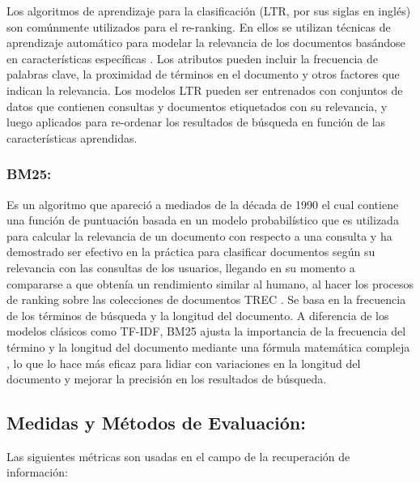 \documentclass[
  12pt,
  openany]{book}
\begin{document}
Los algoritmos de aprendizaje para la clasificación (LTR, por sus siglas en inglés) son comúnmente utilizados para el re-ranking. En ellos se utilizan técnicas de aprendizaje automático para modelar la relevancia de los documentos basándose en características específicas \citep{büttcher2010}. Los atributos pueden incluir la frecuencia de palabras clave, la proximidad de términos en el documento y otros factores que indican la relevancia. Los modelos LTR pueden ser entrenados con conjuntos de datos que contienen consultas y documentos etiquetados con su relevancia, y luego aplicados para re-ordenar los resultados de búsqueda en función de las características aprendidas.

\hypertarget{bm25}{%
\subsubsection{BM25:}\label{bm25}}

Es un algoritmo que apareció a mediados de la década de 1990 el cual contiene una función de puntuación basada en un modelo probabilístico que es utilizada para calcular la relevancia de un documento con respecto a una consulta \citep{robertson2009} y ha demostrado ser efectivo en la práctica para clasificar documentos según su relevancia con las consultas de los usuarios, llegando en su momento a compararse a que obtenía un rendimiento similar al humano, al hacer los procesos de ranking sobre las colecciones \citep{trotman2014} de documentos TREC \citep{trec:ex2005}. Se basa en la frecuencia de los términos de búsqueda y la longitud del documento. A diferencia de los modelos clásicos como TF-IDF, BM25 ajusta la importancia de la frecuencia del término y la longitud del documento mediante una fórmula matemática compleja \citep{zhai2016}, lo que lo hace más eficaz para lidiar con variaciones en la longitud del documento y mejorar la precisión en los resultados de búsqueda.

\hypertarget{evaluacion}{%
\subsection{Medidas y Métodos de Evaluación:}\label{evaluacion}}

Las siguientes métricas son usadas en el campo de la recuperación de información:
\end{document}
